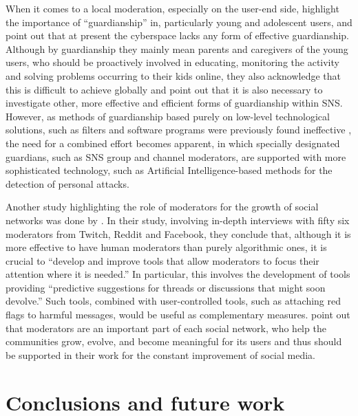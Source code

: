 \documentclass[a4paper,fleqn]{cas-dc}
\begin{document}
When it comes to a local moderation, especially on the user-end side,
\citet{navarro2017one} highlight the importance
of ``guardianship'' in, particularly young and adolescent users, and
point out that at present the cyberspace lacks any form of effective
guardianship. Although by guardianship they mainly mean parents and
caregivers of the young users, who should be proactively involved in
educating, monitoring the activity and solving problems occurring to
their kids online, they also acknowledge that this is difficult to
achieve globally and point out that it is also necessary to investigate
other, more effective and efficient forms of guardianship within SNS.
However, as methods of guardianship based purely on low-level
technological solutions, such as filters and software programs were
previously found ineffective \citep{navarro2012going,navarro2013girls}, the need
for a combined effort becomes apparent, in which specially designated
guardians, such as SNS group and channel moderators, are supported with
more sophisticated technology, such as Artificial Intelligence-based
methods for the detection of personal attacks.

Another study highlighting the role of moderators for the growth of
social networks was done by \citet{seering2019moderator}. In
their study, involving in-depth interviews with fifty six moderators
from Twitch, Reddit and Facebook, they conclude that, although it is
more effective to have human moderators than purely algorithmic ones, it
is crucial to ``develop and improve tools that allow moderators to focus
their attention where it is needed.'' In particular, this involves the
development of tools providing ``predictive suggestions for threads or
discussions that might soon devolve.'' Such tools, combined with
user-controlled tools, such as attaching red flags to harmful messages,
would be useful as complementary measures. \citet{seering2019moderator} point
out that moderators are an important part of each social network, who
help the communities grow, evolve, and become meaningful for its users
and thus should be supported in their work for the constant improvement
of social media.

\section{Conclusions and future work}
\label{conclusions}
\end{document}
